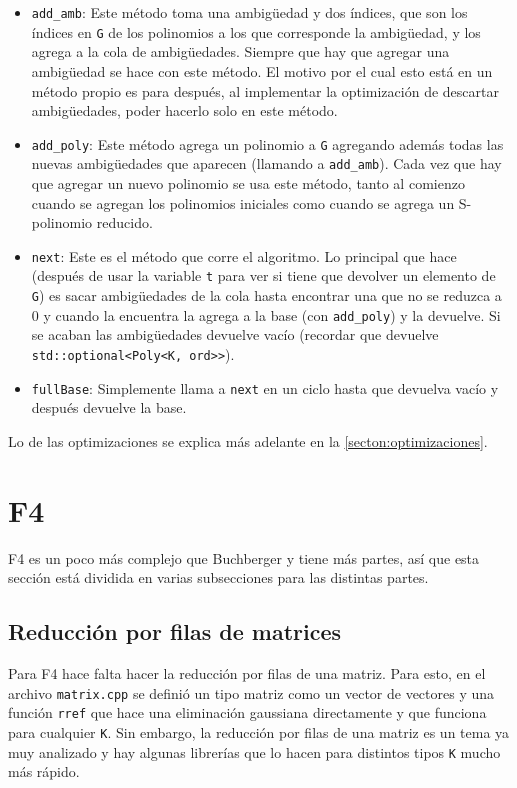 \documentclass[12pt]{report}
\theoremstyle{customstyle}
\theoremstyle{factstyle}
\begin{document}
\begin{itemize}
  \item \texttt{add\_amb}: Este método toma una ambigüedad y dos índices, que son los índices en \texttt{G} de los polinomios a los que corresponde la ambigüedad, y los agrega a la cola de ambigüedades. Siempre que hay que agregar una ambigüedad se hace con este método. El motivo por el cual esto está en un método propio es para después, al implementar la optimización de descartar ambigüedades, poder hacerlo solo en este método.
  \item \texttt{add\_poly}: Este método agrega un polinomio a \texttt{G} agregando además todas las nuevas ambigüedades que aparecen (llamando a \texttt{add\_amb}). Cada vez que hay que agregar un nuevo polinomio se usa este método, tanto al comienzo cuando se agregan los polinomios iniciales como cuando se agrega un S-polinomio reducido.
  \item \texttt{next}: Este es el método que corre el algoritmo. Lo principal que hace (después de usar la variable \texttt{t} para ver si tiene que devolver un elemento de \texttt{G}) es sacar ambigüedades de la cola hasta encontrar una que no se reduzca a $0$ y cuando la encuentra la agrega a la base (con \texttt{add\_poly}) y la devuelve. Si se acaban las ambigüedades devuelve vacío (recordar que devuelve \texttt{std::optional<Poly<K, ord>>}).
  \item \texttt{fullBase}: Simplemente llama a \texttt{next} en un ciclo hasta que devuelva vacío y después devuelve la base.
\end{itemize}

Lo de las optimizaciones se explica más adelante en la \cref{secton:optimizaciones}.


\section{F4}

F4 es un poco más complejo que Buchberger y tiene más partes, así que esta sección está dividida en varias subsecciones para las distintas partes.

\subsection{Reducción por filas de matrices}

Para F4 hace falta hacer la reducción por filas de una matriz. Para esto, en el archivo \texttt{matrix.cpp} se definió un tipo matriz como un vector de vectores y una función \texttt{rref} que hace una eliminación gaussiana directamente y que funciona para cualquier \texttt{K}. Sin embargo, la reducción por filas de una matriz es un tema ya muy analizado y hay algunas librerías que lo hacen para distintos tipos \texttt{K} mucho más rápido.
\end{document}
